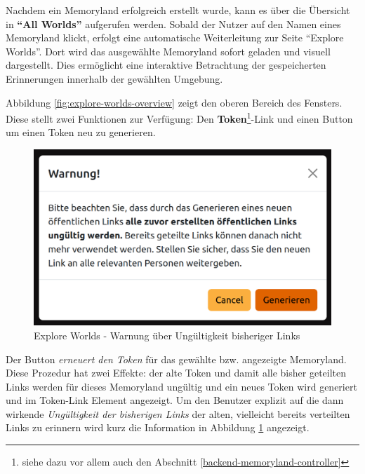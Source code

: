 Nachdem ein Memoryland erfolgreich erstellt wurde, kann es über die Übersicht in \textbf{``All Worlds''} aufgerufen werden. Sobald der Nutzer auf den Namen eines Memoryland klickt, erfolgt eine automatische Weiterleitung zur Seite ``Explore Worlds''. Dort wird das ausgewählte Memoryland sofort geladen und visuell dargestellt. Dies ermöglicht eine interaktive Betrachtung der gespeicherten Erinnerungen innerhalb der gewählten Umgebung.

Abbildung \ref{fig:explore-worlds-overview} zeigt den oberen Bereich des Fensters. Diese stellt zwei Funktionen zur Verfügung: Den \textbf{Token}\footnote{siehe dazu vor allem auch den Abschnitt \ref{backend-memoryland-controller}}-Link  und einen Button um einen Token neu zu generieren.

\begin{figure} [h t]
    \centering
    \includegraphics[scale=0.35]{pics/explore-worlds-warning.png}
    \caption{Explore Worlds - Warnung über Ungültigkeit bisheriger Links}
    \label{fig:explore-worlds-warning}
\end{figure}

Der Button \emph{erneuert den Token} für das gewählte bzw. angezeigte Memoryland. Diese Prozedur hat zwei Effekte: der alte Token und damit alle bisher geteilten Links werden für dieses Memoryland ungültig und ein neues Token wird generiert und im Token-Link Element angezeigt. Um den Benutzer explizit auf die dann wirkende \emph{Ungültigkeit der bisherigen Links} der alten, vielleicht bereits verteilten Links zu erinnern wird kurz die Information in Abbildung \ref{fig:explore-worlds-warning} angezeigt.

